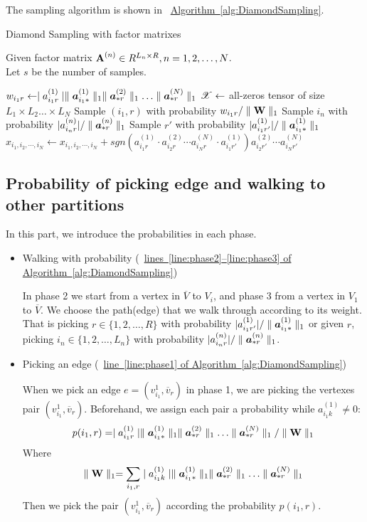 \documentclass{article}
\newcommand{\Sca}[3]{{#1}^{(#2)}_{i_#2#3}}%
\newcommand{\T}[1]{\boldsymbol{\mathscr{\MakeUppercase{#1}}}}%
\newcommand{\V}[1]{{\bm{{\MakeLowercase{#1}}}}}%
\newcommand{\Varow}[1]{\V{a}^{(#1)}_{i_#1*}}
\newcommand{\Vacol}[1]{\V{a}^{(#1)}_{*r}}
\newcommand{\M}[1]{{\bm{\mathbf{\MakeUppercase{#1}}}}}%
\newcommand{\norm}[2]{\parallel#1\parallel_{#2}}
\newcommand{\Alg}[1]{\hyperref[alg:#1]{Algorithm~\ref*{alg:#1}}}
\newcommand{\AlgLine}[2]{\hyperref[alg:#1]{line~\ref*{line:#2} of Algorithm~\ref*{alg:#1}}}
\newcommand{\AlgLines}[3]{\hyperref[alg:#1]{lines~\ref*{line:#2}--\ref*{line:#3} of Algorithm~\ref*{alg:#1}}}
\begin{document}
The sampling algorithm is shown in ~\Alg{DiamondSampling}.

\begin{algorithm}[t]
    \caption{Diamond Sampling with factor matrixes}
    \label{alg:DiamondSampling}
    Given factor matrix $\M{A}^{(n)}\in R^{L_n\times R}, n = 1,2,\ldots,N$.\\
    Let $s$ be the number of samples.
    \begin{algorithmic}[1]
    \For{all $\Sca{a}{1}{r} \neq 0$}
    \State $w_{i_1r} \leftarrow \mid \Sca{a}{1}{r}\mid
    \norm{\Varow{1}}{1}\norm{\Vacol{2}}{1}\ldots\norm{\Vacol{N}}{1} $
    \EndFor
    \State $\T{X} \leftarrow$ all-zeros tensor of size
    $L_1\times L_2\ldots\times L_N$
    \State Sample $(i_1,r)$ with probability $w_{i_1r}/\norm{\M{W}}{1}$        \label{line:phase1}
    \State Sample $i_n$ with probability $|\Sca{a}{n}{r}|/\norm{\Vacol{n}}{1}$
    \label{line:phase2}
    \EndFor
    \State Sample $r'$ with probability $|\Sca{a}{1}{r'}|/\norm{\Varow{1}}{1}$
    \label{line:phase3}
    \State $x_{i_1,i_2,\cdots,i_N}\leftarrow x_{i_1,i_2,\cdots,i_N} +
    sgn(\Sca{a}{1}{r}\cdot\Sca{a}{2}{r}\cdots\Sca{a}{N}{r}\cdot\Sca{a}{1}{r'})
    \Sca{a}{2}{r'}\cdots\Sca{a}{N}{r'}$
    \label{line:scoring}
    \EndFor
    \end{algorithmic}
\end{algorithm}

\subsection{Probability of picking edge and walking to other partitions}

In this part, we introduce the probabilities in each phase.

\begin{itemize}
  \item Walking with probability  (~\AlgLines{DiamondSampling}{phase2}{phase3})

  In phase 2 we start from a vertex in $\overline{V}$ to $V_i$, and phase 3 from a vertex in $V_1$ to $\overline{V}$. We choose the path(edge) that we walk through according to its weight. That is picking $r\in\{1,2,\ldots,R\}$ with probability $|\Sca{a}{1}{r'}|/\norm{\Varow{1}}{1}$ or given $r$, picking $i_n\in\{1,2,\ldots,L_n\}$ with probability $|\Sca{a}{n}{r}|/\norm{\Vacol{n}}{1}$.

  \item Picking an edge (~\AlgLine{DiamondSampling}{phase1})

  When we pick an edge $e=(v^1_{i_1},\overline{v}_r)$ in phase 1, we are picking the vertexes pair $(v^1_{i_1},\overline{v}_r)$. Beforehand, we assign each pair a probability while $ \Sca{a}{1}{k} \neq 0 $:
  \[
    p(i_1,r) = \mid\Sca{a}{1}{r}\mid \norm{\Varow{1}}{1} \norm{\Vacol{2}}{1} \ldots \norm{\Vacol{N}}{1} / \norm{\M{W}}{1}
  \]
  Where
  \[
    \norm{\M{W}}{1} = \sum_{i_1,r}\mid \Sca{a}{1}{k}\mid \norm{\Varow{1}}{1} \norm{\Vacol{2}}{1} \ldots \norm{\Vacol{N}}{1}
  \]
  Then we pick the pair $(v^1_{i_1},\overline{v}_r)$ according the probability $p(i_1,r)$.
\end{itemize}
\end{document}
